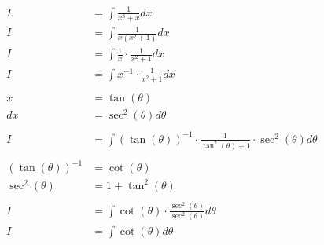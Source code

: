 \documentclass[12pt]{article}
\begin{document}
\begin{align}
    I                               & = \int \frac{1}{x^3+x} dx                                                                \\
    I                               & = \int \frac{1}{x(x^2+1)} dx                                                             \\
    I                               & = \int \frac{1}{x} \cdot \frac{1}{x^2+1} dx                                              \\
    I                               & = \int x^{-1} \cdot \frac{1}{x^2+1} dx                                                   \\
    \nonumber                                                                                                                  \\
    x                               & = \tan(\theta)                                                                           \\
    dx                              & = \sec^2(\theta) d\theta                                                                 \\
    \nonumber                                                                                                                  \\
    I                               & = \int (\tan(\theta))^{-1} \cdot \frac{1}{\tan^2(\theta)+1} \cdot \sec^2(\theta) d\theta \\
    \nonumber                                                                                                                  \\
    (\tan(\theta))^{-1}             & = \cot(\theta)                                                                           \\
    \sec^2(\theta)                  & = 1 + \tan^2(\theta)                                                                     \\
    \nonumber                                                                                                                  \\
    I                               & = \int \cot(\theta) \cdot \frac{\sec^2(\theta)}{\sec^2(\theta)} d\theta                  \\
    I                               & = \int \cot(\theta) d\theta                                                              \\

\end{align}
\end{document}
